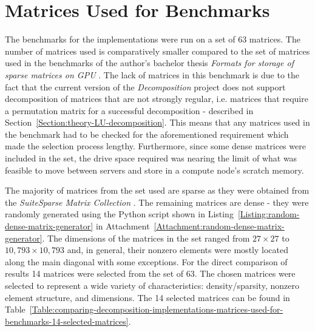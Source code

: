 \section{Matrices Used for Benchmarks \TO}
The benchmarks for the implementations were run on a set of 63 matrices. The number of matrices used is comparatively smaller compared to the set of matrices used in the benchmarks of the author's bachelor thesis \textit{Formats for storage of sparse matrices on GPU} \cite{Cejka2020}. The lack of matrices in this benchmark is due to the fact that the current version of the \textit{Decomposition} project does not support decomposition of matrices that are not strongly regular, i.e. matrices that require a permutation matrix for a successful decomposition - described in Section~\ref{Section:theory-LU-decomposition}. This means that any matrices used in the benchmark had to be checked for the aforementioned requirement which made the selection process lengthy. Furthermore, since some dense matrices were included in the set, the drive space required was nearing the limit of what was feasible to move between servers and store in a compute node's scratch memory.
\par The majority of matrices from the set used are sparse as they were obtained from the \emph{SuiteSparse Matrix Collection} \cite{Davis2011}. The remaining matrices are dense - they were randomly generated using the Python script shown in Listing~\ref{Listing:random-dense-matrix-generator} in Attachment~\ref{Attachment:random-dense-matrix-generator}. The dimensions of the matrices in the set ranged from $ 27 \times 27 $ to $ 10,793 \times 10,793 $ and, in general, their nonzero elements were mostly located along the main diagonal with some exceptions. For the direct comparison of results 14 matrices were selected from the set of 63. The chosen matrices were selected to represent a wide variety of characteristics: density/sparsity, nonzero element structure, and dimensions. The 14 selected matrices can be found in Table~\ref{Table:comparing-decomposition-implementations-matrices-used-for-benchmarks-14-selected-matrices}.

